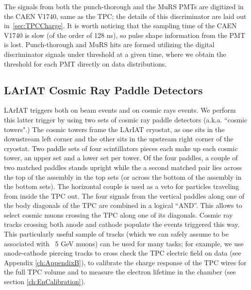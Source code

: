 The signals from both the punch-thorough and the MuRS PMTs are digitized in the CAEN V1740, same as the TPC; the details of this discriminator are laid out in~\ref{sec:TPCCharge}. It is worth noticing that the sampling time of the CAEN V1740 is slow (of the order of 128 ns), so pulse shape information from the PMT is lost.
Punch-thorough and MuRS hits are formed utilizing the digital discriminator signals under threshold at a given time, where we obtain the threshold for each PMT directly on data distributions.



\subsection{LArIAT Cosmic Ray Paddle Detectors}\label{sec:CosmicRayPaddle}
LArIAT triggers both on beam events and on cosmic rays events. We perform this latter trigger by using two sets of cosmic ray paddle detectors (a.k.a. ``cosmic towers".) The cosmic towers frame the LArIAT cryostat, as one sits in the downstream left corner and the other sits in the upstream right corner of the cryostat. Two paddle sets of four scintillators pieces each make up each cosmic tower, an upper set and a lower set per tower. 
Of the four paddles, a couple of two matched paddles stands upright while the a second matched pair lies across the top of the assembly in the top sets (or across the bottom of the assembly in the bottom sets). The horizontal couple is used as a veto for particles traveling from inside the TPC out.  The four signals  from the vertical paddles along one of the body diagonals of the TPC are combined in a logical ``AND''. This allows to select cosmic muons crossing the TPC along one of its diagonals.  Cosmic ray tracks crossing both anode and cathode populate the events triggered this way. This particularly useful sample of tracks (which we can safely assume to be associated with ~5 GeV muons) can be used for many tasks; for example, we use anode-cathode piercing tracks to cross check the TPC electric field on data (see Appendix \ref{ch:AppendixB}), to calibrate the charge response of the TPC wires for the full TPC volume and to measure the electron lifetime in the chamber (see section \ref{ch:EnCalibration}).


